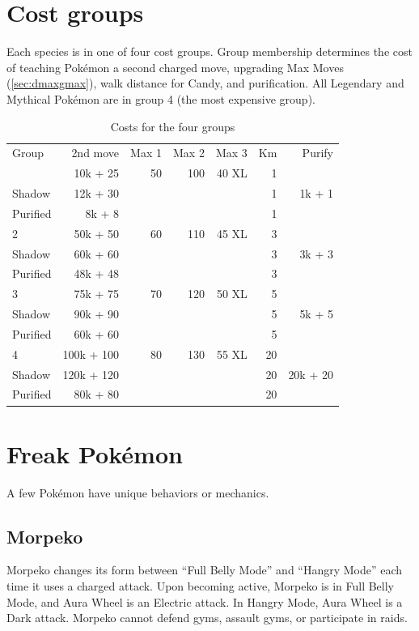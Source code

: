\section{Cost groups\label{sec:costgroups}}
Each species is in one of four cost groups.
Group membership determines the cost of teaching Pokémon a second charged move,
  upgrading Max Moves (\autoref{sec:dmaxgmax}),
  walk distance for Candy,
  and purification.
All Legendary and Mythical Pokémon are in group 4 (the most expensive group).
\begin{table}
\centering
\begin{tabular}{lrrrrrr}
  Group & 2nd move   & Max 1 & Max 2 & Max 3 & Km & Purify\\
\Midrule
      1 & 10k + 25   & 50    & 100   & 40 XL & 1  &       \\
  Shadow& 12k + 30   &       &       &       & 1  & 1k + 1\\
Purified& 8k + 8   &       &       &       & 1  &         \\
      2 & 50k + 50   & 60    & 110   & 45 XL & 3  &       \\
  Shadow& 60k + 60   &       &       &       & 3  & 3k + 3\\
  Purified& 48k + 48   &       &       &       & 3  &     \\
      3 & 75k + 75   & 70    & 120   & 50 XL & 5  &       \\
  Shadow& 90k + 90   &       &       &       & 5  & 5k + 5\\
  Purified & 60k + 60 &   &    &   & 5 &                  \\
      4 & 100k + 100 & 80    & 130   & 55 XL & 20 &       \\
  Shadow& 120k + 120 &       &       &       & 20 & 20k + 20\\
Purified& 80k + 80 &   &    &   & 20 & \\
\end{tabular}
  \caption{Costs for the four groups\label{table:costs}}
\end{table}

\section{Freak Pokémon\label{sec:freaks}}
A few Pokémon have unique behaviors or mechanics.

\subsection{Morpeko\label{subsec:morpeko}}
Morpeko changes its form between ``Full Belly Mode'' and ``Hangry Mode''
  each time it uses a charged attack.
Upon becoming active, Morpeko is in Full Belly Mode, and Aura Wheel is an Electric attack.
In Hangry Mode, Aura Wheel is a Dark attack.
Morpeko cannot defend gyms, assault gyms, or participate in raids.

